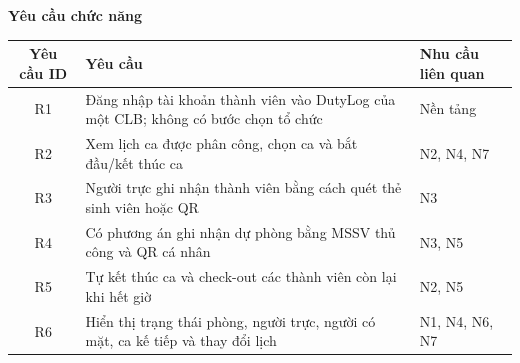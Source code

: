 \par\medskip\noindent\textbf{Yêu cầu chức năng}\par\medskip
{\centering
\begin{tabularx}{0.95\textwidth}{|c|X|X|}
\hline
\textbf{Yêu cầu ID} & \textbf{Yêu cầu} & \textbf{Nhu cầu liên quan} \\ \hline
R1 & Đăng nhập tài khoản thành viên vào DutyLog của một CLB; không có bước chọn tổ chức & Nền tảng \\ \hline
R2 & Xem lịch ca được phân công, chọn ca và bắt đầu/kết thúc ca & N2, N4, N7 \\ \hline
R3 & Người trực ghi nhận thành viên bằng cách quét thẻ sinh viên hoặc QR & N3 \\ \hline
R4 & Có phương án ghi nhận dự phòng bằng MSSV thủ công và QR cá nhân & N3, N5 \\ \hline
R5 & Tự kết thúc ca và check-out các thành viên còn lại khi hết giờ & N2, N5 \\ \hline
R6 & Hiển thị trạng thái phòng, người trực, người có mặt, ca kế tiếp và thay đổi lịch & N1, N4, N6, N7 \\ \hline
\end{tabularx}\par}
\normalsize

